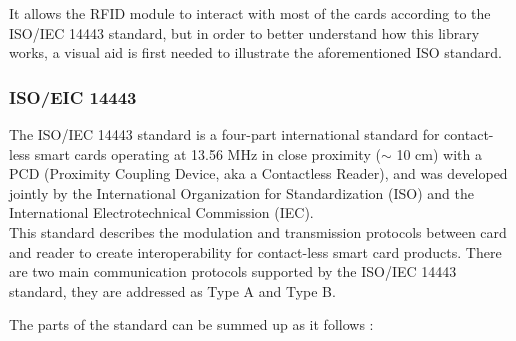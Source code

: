 \documentclass[target=bach,aauheader=,style=]{thud}
\begin{document}
It allows the RFID module to interact with most of the cards according to the ISO/IEC 14443 standard, but in order to better understand how this library works, a visual aid is first needed to illustrate the aforementioned ISO standard.

\subsubsection{ISO/EIC 14443}


The ISO/IEC 14443 standard \cite{wiki:iso14443} is a four-part international standard for contact-less smart cards operating at 13.56 MHz in close proximity ($\sim$ 10 cm) with a PCD (Proximity Coupling Device, aka a Contactless Reader), and was developed jointly by the International Organization for Standardization (ISO) and the International Electrotechnical Commission (IEC).\cite{iso14443}\\ This standard describes the modulation and transmission protocols between card and reader to create interoperability for contact-less smart card products. There are two main communication protocols supported by the ISO/IEC 14443 standard, they are addressed as Type A and Type B. \cite{nfc-tools}\par

The parts of the standard can be summed up as it follows \cite{an10833}:
\end{document}
